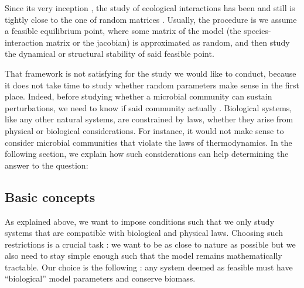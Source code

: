 \documentclass[12pt, titlepage]{report}
\begin{document}
Since its very inception \cite{may_will_1972}, the study of ecological interactions has been and still is tightly close to the one of random matrices \cite{allesina_stability_2012, allesina_predicting_2015, barbier_cavity_2017}. Usually, the procedure is we assume a feasible equilibrium point, where some matrix of the model (\eg the species-interaction matrix or the jacobian) is approximated as random, and then study the dynamical or structural stability of said feasible point.

That framework is not satisfying for the study we would like to conduct, because it does not take time to study whether random parameters make sense in the first place.
Indeed, before studying whether a microbial community can sustain perturbations, we need to know if said community actually . Biological systems, like any other natural systems, are constrained by laws, whether they arise from physical or biological considerations. For instance, it would not make sense to consider microbial communities that \eg violate the laws of thermodynamics. In the following section, we explain how such considerations can help determining the answer to the  question:

\begin{centering}
\end{centering}
\subsection{Basic concepts}\label{sec : methods feasibility basic concepts}
As explained above, we want to impose conditions such that we only study systems that are compatible with biological and physical laws. Choosing such restrictions is a crucial task : we want to be as close to nature as possible but we also need to stay simple enough such that the model remains mathematically tractable. Our %
choice is the following :
  any system deemed as feasible must have ``biological'' model parameters and conserve biomass.
\end{document}
